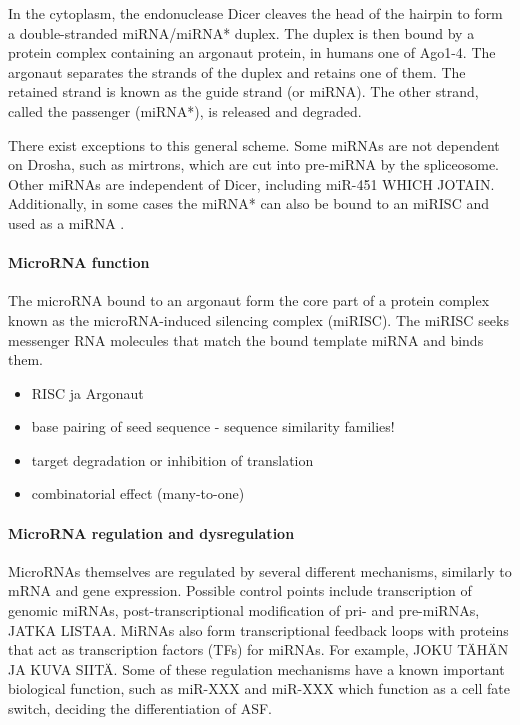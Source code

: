 In the cytoplasm, the endonuclease Dicer cleaves the head of the hairpin to
form a double-stranded miRNA/miRNA* duplex. The duplex is then bound by a
protein complex containing an argonaut protein, in humans one of Ago1-4. The
argonaut separates the strands of the duplex and retains one of them. The
retained strand is known as the guide strand (or miRNA). The other strand,
called the passenger (miRNA*), is released and degraded.

There exist exceptions to this general scheme. Some miRNAs are not dependent
on Drosha, such as mirtrons, which are cut into pre-miRNA by the spliceosome.
Other miRNAs are independent of Dicer, including miR-451 WHICH JOTAIN.
Additionally, in some cases the miRNA* can also be bound to an miRISC and used
as a miRNA \citep{CITE}.





\paragraph{MicroRNA function}\label{microrna-function}

The microRNA bound to an argonaut form the core part of a protein complex
known as the microRNA-induced silencing complex (miRISC). The miRISC seeks
messenger RNA molecules that match the bound template miRNA and binds them.

\begin{itemize}
\item
  RISC ja Argonaut
\item
  base pairing of seed sequence - sequence similarity families!
\item
  target degradation or inhibition of translation
\item
  combinatorial effect (many-to-one)
\end{itemize}





\paragraph{MicroRNA regulation and dysregulation}\label{microrna-
regulation-and-dysregulation}

MicroRNAs themselves are regulated by several different mechanisms, similarly
to mRNA and gene expression. Possible control points include transcription of
genomic miRNAs, post-transcriptional modification of pri- and pre-miRNAs,
JATKA LISTAA. MiRNAs also form transcriptional feedback loops with proteins
that act as transcription factors (TFs) for miRNAs. For example, JOKU TÄHÄN JA
KUVA SIITÄ. Some of these regulation mechanisms have a known important
biological function, such as miR-XXX and miR-XXX which function as a cell fate
switch, deciding the differentiation of ASF.

